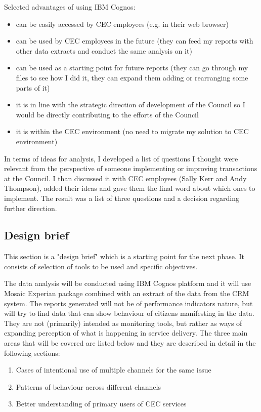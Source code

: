 Selected advantages of using IBM Cognos:
\begin{itemize}
\item can be easily accessed by CEC employees (e.g. in their web browser)
\item can be used by CEC employees in the future (they can feed my reports with other data extracts and conduct the same analysis on it)
\item can be used as a starting point for future reports (they can go through my files to see how I did it, they can expand them adding or rearranging some parts of it)
\item it is in line with the strategic direction of development of the Council so I would be directly contributing to the efforts of the Council
\item it is within the CEC environment (no need to migrate my solution to CEC environment)
\end{itemize}

In terms of ideas for analysis, I developed a list of questions I thought were relevant from the perspective of someone implementing or improving transactions at the Council. I than discussed it with CEC employees (Sally Kerr and Andy Thompson), added their ideas and gave them the final word about which ones to implement. The result was a list of three questions and a decision regarding further direction.
		
		\subsection{Design brief}
This section is a "design brief" which is a starting point for the next phase. It consists of selection of tools to be used and specific objectives.

The data analysis will be conducted using IBM Cognos platform and it will use Mosaic Experian package combined with an extract of the data from the CRM system. The reports generated will not be of performance indicators nature, but will try to find data that can show behaviour of citizens manifesting in the data. They are not (primarily) intended as monitoring tools, but rather as ways of expanding perception of what is happening in service delivery. The three main areas that will be covered are listed below and they are described in detail in the following sections:
\begin{enumerate}
\item Cases of intentional use of multiple channels for the same issue
\item Patterns of behaviour across different channels
\item Better understanding of primary users of CEC services
\end{enumerate}
		
